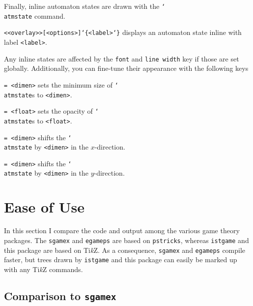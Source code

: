 \documentclass{article}
\newenvironment{desc}{\itemize[leftmargin=50pt]}{\enditemize}
\def\macroarg#1#2{\item[\cmd{#1}] \hskip-2.5pt\texttt{#2}}
\def\option#1#2{\item[\texttt{#1}] \hskip-1.5pt\texttt{#2}}
\renewcommand{\textbackslash}{\char`\\}
\def\cmd#1{\texttt{\color{cmd}\textbackslash#1}}
\def\leftbrace{\char`\{}
\def\rightbrace{\char`\}}
\def\arg#1{{\color{cmd}\leftbrace}{\color{black}#1}{\color{cmd}\rightbrace}}
\def\optarg[#1]{{\color{player1}[#1]}}
\def\TikZ{Ti\emph{k}Z\xspace}
\begin{document}
\noindent Finally, inline automaton states are drawn with the \cmd{atmstate} command.

\begin{desc}
\macroarg{atmstate}{<<overlay>>\optarg[<options>]\arg{<label>}} displays an automaton state inline with label \texttt{<label>}.
\end{desc}

\noindent Any inline states are affected by the \texttt{font} and \texttt{line width} key if those are set globally. Additionally, you can fine-tune their appearance with the following keys

\begin{desc}
\option{inline radius}{= <dimen>} sets the minimum size of \cmd{atmstate}s to \texttt{<dimen>}.

\option{opacity}{= <float>} sets the opacity of \cmd{atmstate}s to \texttt{<float>}.

\option{xshift}{= <dimen>} shifts the \cmd{atmstate} by \texttt{<dimen>} in the $x$-direction.

\option{yshift}{= <dimen>} shifts the \cmd{atmstate} by \texttt{<dimen>} in the $y$-direction.
\end{desc}



\section{Ease of Use}\label{sec:Comparison}
\resetplayernames
{}

In this section I compare the code and output among the various game theory packages. The \texttt{sgamex} and \texttt{egameps} are based on \texttt{pstricks}, whereas \texttt{istgame} and this package are based on \TikZ. As a consequence, \texttt{sgamex} and \texttt{egameps} compile faster, but trees drawn by \texttt{istgame} and this package can easily be marked up with any \TikZ commands.

\subsection{Comparison to \texttt{sgamex}}

\end{document}
